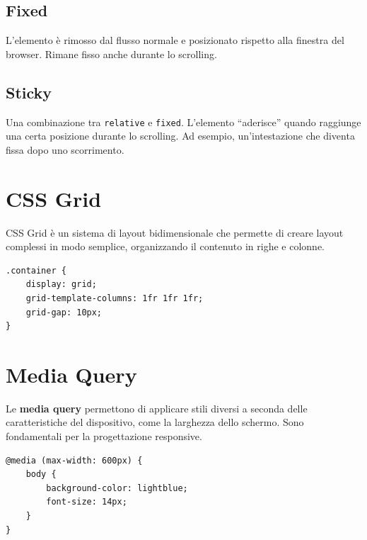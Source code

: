 \subsection{Fixed}

L'elemento è rimosso dal flusso normale e posizionato rispetto alla finestra del browser. Rimane fisso anche durante lo scrolling.

\subsection{Sticky}

Una combinazione tra \texttt{relative} e \texttt{fixed}. L'elemento ``aderisce'' quando raggiunge una certa posizione durante lo scrolling. Ad esempio, un'intestazione che diventa fissa dopo uno scorrimento.

\section{CSS Grid}

CSS Grid è un sistema di layout bidimensionale che permette di creare layout complessi in modo semplice, organizzando il contenuto in righe e colonne.

\begin{lstlisting}[caption=Esempio di CSS Grid]
.container {
    display: grid;
    grid-template-columns: 1fr 1fr 1fr;
    grid-gap: 10px;
}
\end{lstlisting}

\section{Media Query}

Le \textbf{media query} permettono di applicare stili diversi a seconda delle caratteristiche del dispositivo, come la larghezza dello schermo. Sono fondamentali per la progettazione responsive.

\begin{lstlisting}[caption=Esempio di media query]
@media (max-width: 600px) {
    body {
        background-color: lightblue;
        font-size: 14px;
    }
}
\end{lstlisting}
